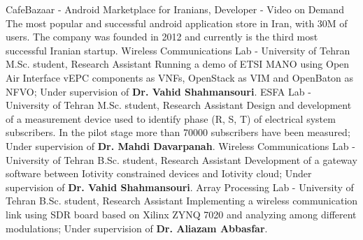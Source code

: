 {}
{CafeBazaar - Android Marketplace for Iranians,}
{Developer - Video on Demand}
{
  The most popular and successful android application store in Iran, with 30M of users. The company
was founded in 2012 and currently is the third most successful Iranian startup.
}
{}
{Wireless Communications Lab - University of Tehran}
{M.Sc. student, Research Assistant}
{
  Running a demo of ETSI MANO using Open Air Interface vEPC components as VNFs, OpenStack as VIM and OpenBaton as NFVO;
  Under supervision of \textbf{Dr. Vahid Shahmansouri}.
}
\medskip
{}
{}
{ESFA Lab - University of Tehran}
{M.Sc. student, Research Assistant}
{
  Design and development of a measurement device used to identify phase (R, S, T) of electrical system subscribers.
  In the pilot stage more than 70000 subscribers have been measured;
  Under supervision of \textbf{Dr. Mahdi Davarpanah}.
}
\medskip
{}
{}
{Wireless Communications Lab - University of Tehran}
{B.Sc. student, Research Assistant}
{
  Development of a gateway software between Iotivity constrained devices and Iotivity cloud;
  Under supervision of \textbf{Dr. Vahid Shahmansouri}.
}
\medskip
{}
{}
{Array Processing Lab - University of Tehran}
{B.Sc. student, Research Assistant}
{
  Implementing a wireless communication link using SDR board based on Xilinx ZYNQ 7020 and analyzing among different modulations;
  Under supervision of \textbf{Dr. Aliazam Abbasfar}.
}
